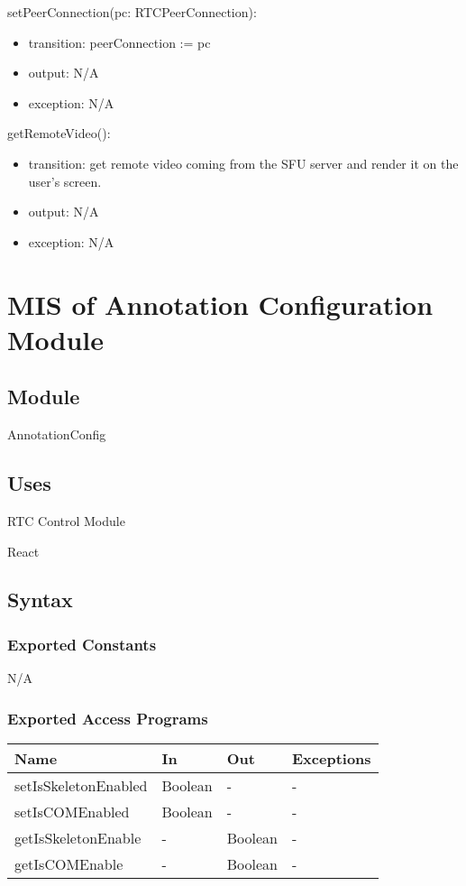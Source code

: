 \documentclass[12pt, titlepage]{article}
\begin{document}
\noindent setPeerConnection(pc: RTCPeerConnection):
\begin{itemize}
\item transition: peerConnection := pc
\item output: N/A
\item exception: N/A
\end{itemize}

\noindent getRemoteVideo():
\begin{itemize}
\item transition: get remote video coming from the SFU server and render it on the
  user's screen.
\item output: N/A
\item exception: N/A
\end{itemize}


\section{MIS of Annotation Configuration Module} \label{sec:annoconfig}

\subsection{Module}

AnnotationConfig

\subsection{Uses}

\noindent RTC Control Module

\noindent React

\subsection{Syntax}

\subsubsection{Exported Constants}

N/A

\subsubsection{Exported Access Programs}

\begin{center}
  \begin{tabular}{p{4cm} p{4cm} p{4cm} p{2cm}}
    \hline
    \textbf{Name}              & \textbf{In}   & \textbf{Out}  & \textbf{Exceptions} \\
    \hline
    setIsSkeletonEnabled & Boolean & -       & -             \\
    setIsCOMEnabled      & Boolean & -       & -             \\
    getIsSkeletonEnable  & -       & Boolean & -             \\
    getIsCOMEnable       & -       & Boolean & -             \\
    \hline
  \end{tabular}
\end{center}
\end{document}

